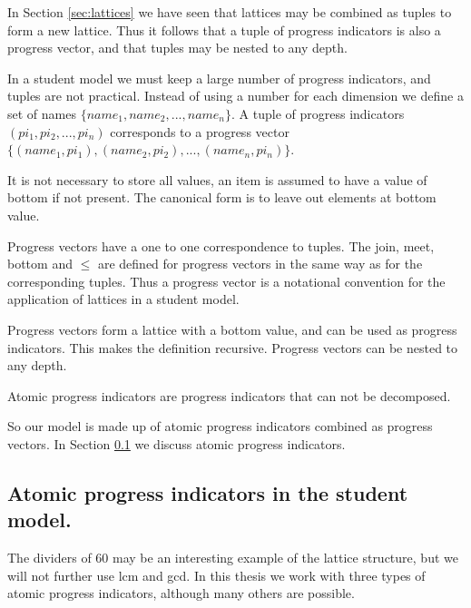 In Section \ref{sec:lattices} we have seen that lattices may be combined as tuples to form a new lattice.
Thus it follows that a tuple of progress indicators is also a progress vector, and that tuples may be nested to any depth.

In a student model we must keep a large number of progress indicators, and tuples are not practical.
Instead of using a number for each dimension we define a set of names $\{name_{1}, name_{2}, ... ,name_{n}\}$. 
A tuple of progress indicators $(pi_{1}, pi_{2}, ..., pi_{n})$ corresponds to a progress vector
$\{(name_{1}, pi_{1}), (name_{2}, pi_{2}), ... , (name_{n}, pi_{n})\}$.

It is not necessary to store all values,  an item is assumed to have a value of bottom if not present.
The canonical form is to leave out elements at bottom value. 

Progress vectors have a one to one correspondence to tuples.
The join, meet, bottom and $\leq$ are defined for progress vectors in the same way as for the corresponding tuples.
Thus a progress vector is a notational convention for the application of lattices in a student model.

Progress vectors form a lattice with a bottom value, and can be used as progress indicators.
This makes the definition recursive.
Progress vectors can be nested to any depth. 

\begin{definition}
Atomic progress indicators are progress indicators that can not be decomposed. 
\end{definition}

So our model is made up of atomic progress indicators combined as progress vectors.
In Section \ref{apival} we discuss atomic progress indicators.

\subsection{Atomic progress indicators in the student model.}
\label{apival}
The dividers of 60 may be an interesting example of the lattice structure, but we will not further use lcm and gcd.
In this thesis we work with three types of atomic progress indicators, although many others are possible.


